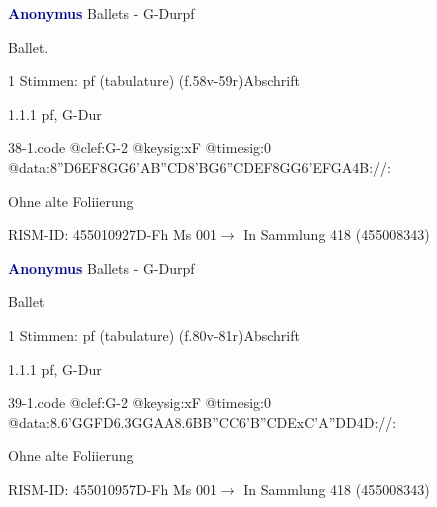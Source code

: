 \documentclass[twocolumn]{book}
\begin{document}
\par \vspace{7pt} \textcolor{darkblue}{\textbf{Anonymus  }}\hfillplus{\textbf{[38]}}\newline Ballets - G-Dur\newline pf
\par \begin{itshape}[f.58v, at left:] Ballet.\end{itshape} 
\par \textcolor{darkblue}{}  1 Stimmen: pf (tabulature)  (f.58v-59r)\newline Abschrift
\par 1.1.1  pf, G-Dur  
\begin{filecontents*}{38-1.code}
@clef:G-2
@keysig:xF
@timesig:0
@data:{8''D6EF8GG}{6'AB''CD}{8'BG}{6''CDEF}{8GG}{6'EFGA}4B://:
\end{filecontents*}
\newline
%
\par Ohne alte Foliierung
\par RISM-ID: 455010927\newline D-Fh  Ms 001\newline $\rightarrow$ In Sammlung 418 (455008343)
      
\par \vspace{7pt} \textcolor{darkblue}{\textbf{Anonymus  }}\hfillplus{\textbf{[39]}}\newline Ballets - G-Dur\newline pf
\par \begin{itshape}[f.80v, at left:] Ballet\end{itshape} 
\par \textcolor{darkblue}{}  1 Stimmen: pf (tabulature)  (f.80v-81r)\newline Abschrift
\par 1.1.1  pf, G-Dur  
\begin{filecontents*}{39-1.code}
@clef:G-2
@keysig:xF
@timesig:0
@data:8.6{'GG}{FD}{6.3GGAA}{8.6BB}{''CC}{6'B''CDE}{xC'A''DD}4D://:
\end{filecontents*}
\newline
%
\par Ohne alte Foliierung
\par RISM-ID: 455010957\newline D-Fh  Ms 001\newline $\rightarrow$ In Sammlung 418 (455008343)
      
\end{document}
